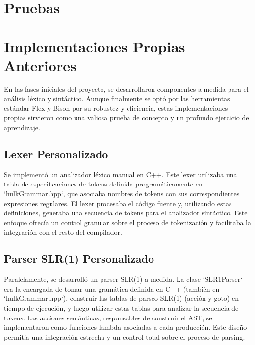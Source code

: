 \documentclass{article}
\begin{document}
\section{Pruebas}

\section{Implementaciones Propias Anteriores}
En las fases iniciales del proyecto, se desarrollaron componentes a medida para el análisis léxico y sintáctico. Aunque finalmente se optó por las herramientas estándar Flex y Bison por su robustez y eficiencia, estas implementaciones propias sirvieron como una valiosa prueba de concepto y un profundo ejercicio de aprendizaje.

\subsection{Lexer Personalizado}
Se implementó un analizador léxico manual en C++. Este lexer utilizaba una tabla de especificaciones de tokens definida programáticamente en `hulkGrammar.hpp`, que asociaba nombres de tokens con sus correspondientes expresiones regulares. El lexer procesaba el código fuente y, utilizando estas definiciones, generaba una secuencia de tokens para el analizador sintáctico. Este enfoque ofrecía un control granular sobre el proceso de tokenización y facilitaba la integración con el resto del compilador.

\subsection{Parser SLR(1) Personalizado}
Paralelamente, se desarrolló un parser SLR(1) a medida. La clase `SLR1Parser` era la encargada de tomar una gramática definida en C++ (también en `hulkGrammar.hpp`), construir las tablas de parseo SLR(1) (acción y goto) en tiempo de ejecución, y luego utilizar estas tablas para analizar la secuencia de tokens. Las acciones semánticas, responsables de construir el AST, se implementaron como funciones lambda asociadas a cada producción. Este diseño permitía una integración estrecha y un control total sobre el proceso de parsing.

\appendix
\end{document}
